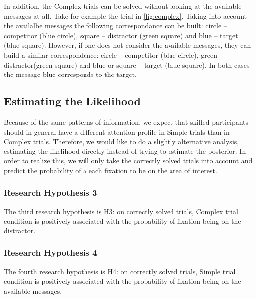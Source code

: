 In addition, the Complex trials can be solved without looking at the available messages at all. Take for example the trial in \autoref{fig:complex}. Taking into account the availalbe messages the following correspondance can be built: circle -- competitor (blue circle), square -- distractor (green square) and blue -- target (blue square). However, if one does not consider the available messages, they can build a similar correspondence: circle -- competitor (blue circle), green -- distractor(green square) and blue or square -- target (blue square). In both cases the message blue corresponds to the target.

\subsection{Estimating the Likelihood}
\label{sec:likelihood}

Because of the same patterns of information, we expect that skilled participants should in general have a different attention profile in Simple trials than in Complex trials. Therefore, we would like to do a slightly alternative analysis, estimating the likelihood directly instead of trying to estimate the posterior. In order to realize this, we will only take the correctly solved trials into account and predict the probability of a each fixation to be on the area of interest.

\subsubsection{Research Hypothesis 3}
\label{sec:h3}
The third research hypothesis is H3: on correctly solved trials, Complex trial condition is positively associated with the probability of fixation being on the distractor. 

\subsubsection{Research Hypothesis 4}
\label{sec:h4}
The fourth research hypothesis is H4: on correctly solved trials, Simple trial condition is positively associated with the probability of fixation being on the available messages.


